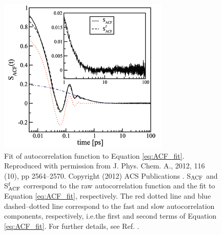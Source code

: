 \documentclass[9pt,bestpractices]{livecoms}
\providecommand{\DIFadd}[1]{{\protect\color{blue}\uwave{#1}}} %
\providecommand{\DIFaddFL}[1]{\DIFadd{#1}} %
\providecommand{\DIFaddbeginFL}{} %
\providecommand{\DIFaddendFL}{} %
\begin{document}
\begin{figure}[htb!]
	\centering
	\includegraphics[width=3.2in]{FanourgakisFig1.png}
	\caption{Fit of autocorrelation function to Equation \ref{eq:ACF_fit}. Reproduced with permission from J. Phys. Chem. A., 2012, 116 (10), pp 2564--2570. Copyright (2012) ACS Publications \cite{Fanourgakis2012}. S$_{\rm ACF}$ and S$^{\rm f}_{\rm ACF}$ correspond to the raw autocorrelation function and the fit to Equation \ref{eq:ACF_fit}, respectively. The red dotted line and blue dashed--dotted line correspond to the fast and slow autocorrelation components, respectively, i.e.\DIFaddbeginFL \DIFaddFL{, }\DIFaddendFL the first and second terms of Equation \ref{eq:ACF_fit}. For further details, see Ref. \cite{Fanourgakis2012}.}
	\label{fig:FanourgakisFig1}
\end{figure}

\end{document}
